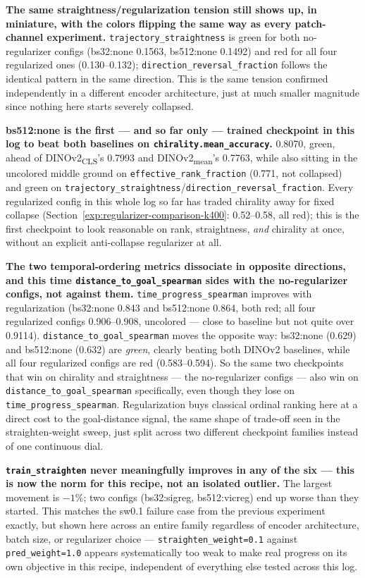 \textbf{The same straightness/regularization tension still shows up, in miniature, with
the colors flipping the same way as every patch-channel experiment.}
\texttt{trajectory\_straightness} is green for both no-regularizer configs (bs32:none
0.1563, bs512:none 0.1492) and red for all four regularized ones (0.130--0.132);
\texttt{direction\_reversal\_fraction} follows the identical pattern in the same
direction. This is the same tension confirmed independently in a different encoder
architecture, just at much smaller magnitude since nothing here starts severely
collapsed.

\textbf{bs512:none is the first --- and so far only --- trained checkpoint in this log to
beat both baselines on \texttt{chirality.mean\_accuracy}.} 0.8070, green, ahead of
DINOv2\textsubscript{CLS}'s 0.7993 and DINOv2\textsubscript{mean}'s 0.7763, while also
sitting in the uncolored middle ground on \texttt{effective\_rank\_fraction} (0.771,
not collapsed) and green on \texttt{trajectory\_straightness}/\texttt{direction\_reversal\_fraction}.
Every regularized config in this whole log so far has traded chirality away for fixed
collapse (Section~\ref{exp:regularizer-comparison-k400}: 0.52--0.58, all red); this is
the first checkpoint to look reasonable on rank, straightness, \emph{and} chirality at
once, without an explicit anti-collapse regularizer at all.

\textbf{The two temporal-ordering metrics dissociate in opposite directions, and this
time \texttt{distance\_to\_goal\_spearman} sides with the no-regularizer configs, not
against them.} \texttt{time\_progress\_spearman} improves with regularization (bs32:none
0.843 and bs512:none 0.864, both red; all four regularized configs 0.906--0.908,
uncolored --- close to baseline but not quite over 0.9114). \texttt{distance\_to\_goal\_spearman}
moves the opposite way: bs32:none (0.629) and bs512:none (0.632) are \emph{green},
clearly beating both DINOv2 baselines, while all four regularized configs are red
(0.583--0.594). So the same two checkpoints that win on chirality and straightness ---
the no-regularizer configs --- also win on \texttt{distance\_to\_goal\_spearman}
specifically, even though they lose on \texttt{time\_progress\_spearman}. Regularization
buys classical ordinal ranking here at a direct cost to the goal-distance signal, the
same shape of trade-off seen in the straighten-weight sweep, just split across two
different checkpoint families instead of one continuous dial.

\textbf{\texttt{train\_straighten} never meaningfully improves in any of the six --- this
is now the norm for this recipe, not an isolated outlier.} The largest movement is
$-1\%$; two configs (bs32:sigreg, bs512:vicreg) end up worse than they started. This
matches the sw0.1 failure case from the previous experiment exactly, but shown here
across an entire family regardless of encoder architecture, batch size, or regularizer
choice --- \texttt{straighten\_weight=0.1} against \texttt{pred\_weight=1.0} appears
systematically too weak to make real progress on its own objective in this recipe,
independent of everything else tested across this log.

